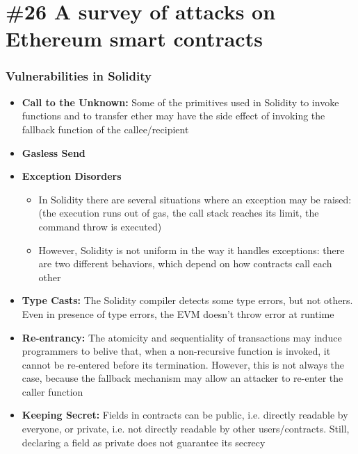 \section{\#26 A survey of attacks on Ethereum smart contracts}
\subsubsection{Vulnerabilities in Solidity}
\begin{itemize}
	\item \textbf{Call to the Unknown:} Some of the primitives used in Solidity to invoke functions and to transfer ether may have the side effect of invoking the fallback function of the callee/recipient
	\item\textbf{Gasless Send}
	\item\textbf{Exception Disorders}
	\begin{itemize}
		\item In Solidity there are several situations where an exception may be raised: (the execution runs out of gas, the call stack reaches its limit, the command throw is executed)
		\item However, Solidity is not uniform in the way it handles exceptions: there are two different behaviors, which depend on how contracts call each other
	\end{itemize}
	\item\textbf{Type Casts:} The Solidity compiler detects some type errors, but not others. Even in presence of type errors, the EVM doesn't throw error at runtime
	\item\textbf{Re-entrancy:} The atomicity and sequentiality of transactions may induce programmers to belive that, when a non-recursive function is invoked, it cannot be re-entered before its termination. However, this is not always the case, because the fallback mechanism may allow an attacker to re-enter the caller function
	\item\textbf{Keeping Secret:} Fields in contracts can be public, i.e. directly readable by everyone, or private, i.e. not directly readable by other users/contracts. Still, declaring a field as private does not guarantee its secrecy
\end{itemize}
